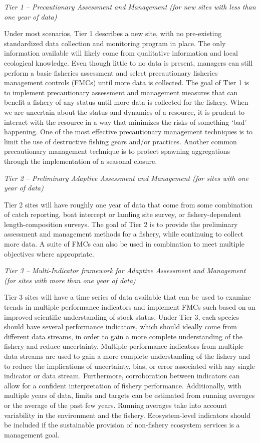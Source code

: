 \documentclass[]{book}
\begin{document}
\emph{Tier 1 -- Precautionary Assessment and Management (for new sites
with less than one year of data)}

Under most scenarios, Tier 1 describes a new site, with no pre-existing
standardized data collection and monitoring program in place. The only
information available will likely come from qualitative information and
local ecological knowledge. Even though little to no data is present,
managers can still perform a basic fisheries assessment and select
precautionary fisheries management controls (FMCs) until more data is
collected. The goal of Tier 1 is to implement precautionary assessment
and management measures that can benefit a fishery of any status until
more data is collected for the fishery. When we are uncertain about the
status and dynamics of a resource, it is prudent to interact with the
resource in a way that minimizes the risks of something `bad' happening.
One of the most effective precautionary management techniques is to
limit the use of destructive fishing gears and/or practices. Another
common precautionary management technique is to protect spawning
aggregations through the implementation of a seasonal closure.

\emph{Tier 2 -- Preliminary Adaptive Assessment and Management (for
sites with one year of data)}

Tier 2 sites will have roughly one year of data that come from some
combination of catch reporting, boat intercept or landing site survey,
or fishery-dependent length-composition surveys. The goal of Tier 2 is
to provide the preliminary assessment and management methods for a
fishery, while continuing to collect more data. A suite of FMCs can also
be used in combination to meet multiple objectives where appropriate.

\emph{Tier 3 -- Multi-Indicator framework for Adaptive Assessment and
Management (for sites with more than one year of data)}

Tier 3 sites will have a time series of data available that can be used
to examine trends in multiple performance indicators and implement FMCs
such based on an improved scientific understanding of stock status.
Under Tier 3, each species should have several performance indicators,
which should ideally come from different data streams, in order to gain
a more complete understanding of the fishery and reduce uncertainty.
Multiple performance indicators from multiple data streams are used to
gain a more complete understanding of the fishery and to reduce the
implications of uncertainty, bias, or error associated with any single
indicator or data stream. Furthermore, corroboration between indicators
can allow for a confident interpretation of fishery performance.
Additionally, with multiple years of data, limits and targets can be
estimated from running averages or the average of the past few years.
Running averages take into account variability in the environment and
the fishery. Ecosystem-level indicators should be included if the
sustainable provision of non-fishery ecosystem services is a management
goal.
\end{document}
